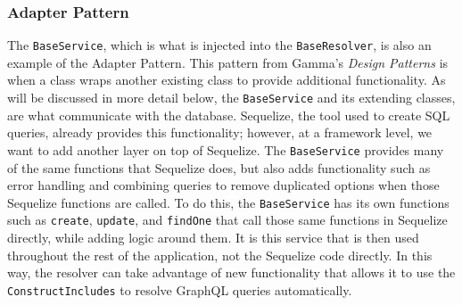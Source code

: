 \subsubsection{Adapter Pattern}
The \verb!BaseService!, which is what is injected into the \verb!BaseResolver!, is also an example of the Adapter Pattern.  This pattern from Gamma's \textit{Design Patterns} is when a class wraps another existing class to provide additional functionality.  As will be discussed in more detail below, the \verb!BaseService! and its extending classes, are what communicate with the database.  Sequelize, the tool used to create SQL queries, already provides this functionality; however, at a framework level, we want to add another layer on top of Sequelize.  The \verb!BaseService! provides many of the same functions that Sequelize does, but also adds functionality such as error handling and combining queries to remove duplicated options when those Sequelize functions are called.  To do this, the \verb!BaseService! has its own functions such as \verb!create!, \verb!update!, and \verb!findOne! that call those same functions in Sequelize directly, while adding logic around them.  It is this service that is then used throughout the rest of the application, not the Sequelize code directly.  In this way, the resolver can take advantage of new functionality that allows it to use the \verb!ConstructIncludes! to resolve GraphQL queries automatically.
